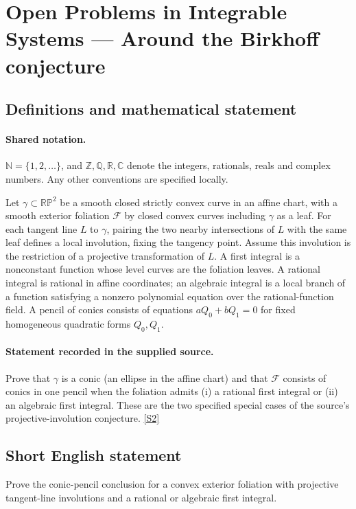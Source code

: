 \documentclass[11pt]{article}
\newcommand{\sref}[2]{\hyperlink{source:#1:#2}{[S#2]}}
\begin{document}
\section{Open Problems in Integrable Systems — Around the Birkhoff conjecture}\label{statement}

\subsection{Definitions and mathematical statement}

\paragraph{Shared notation.}$\mathbb N=\{1,2,\ldots\}$, and $\mathbb Z,\mathbb Q,\mathbb R,\mathbb C$ denote the integers, rationals, reals and complex numbers. Any other conventions are specified locally.


Let $\gamma\subset\mathbb{RP}^2$ be a smooth closed strictly convex curve in an affine chart, with a smooth exterior foliation $\mathcal F$ by closed convex curves including $\gamma$ as a leaf. For each tangent line $L$ to $\gamma$, pairing the two nearby intersections of $L$ with the same leaf defines a local involution, fixing the tangency point. Assume this involution is the restriction of a projective transformation of $L$. A first integral is a nonconstant function whose level curves are the foliation leaves. A rational integral is rational in affine coordinates; an algebraic integral is a local branch of a function satisfying a nonzero polynomial equation over the rational-function field. A pencil of conics consists of equations $aQ_0+bQ_1=0$ for fixed homogeneous quadratic forms $Q_0,Q_1$.
\paragraph{Statement recorded in the supplied source.}
Prove that $\gamma$ is a conic (an ellipse in the affine chart) and that $\mathcal F$ consists of conics in one pencil when the foliation admits (i) a rational first integral or (ii) an algebraic first integral. These are the two specified special cases of the source's projective-involution conjecture. \sref{statement}{2}
\subsection{Short English statement}
Prove the conic-pencil conclusion for a convex exterior foliation with projective tangent-line involutions and a rational or algebraic first integral.
\end{document}
